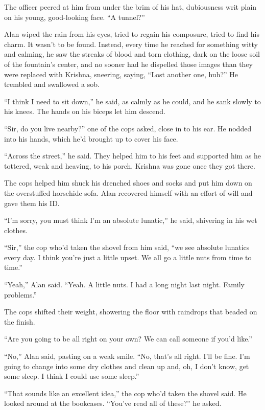 \documentclass{article}
\begin{document}
The officer peered at him from under the brim of his hat, dubiousness
writ plain on his young, good-looking face.  ``A tunnel?''

Alan wiped the rain from his eyes, tried to regain his composure,
tried to find his charm.  It wasn't to be found.  Instead, every time
he reached for something witty and calming, he saw the streaks of
blood and torn clothing, dark on the loose soil of the fountain's
center, and no sooner had he dispelled those images than they were
replaced with Krishna, sneering, saying, ``Lost another one, huh?'' He
trembled and swallowed a sob.

``I think I need to sit down,'' he said, as calmly as he could, and he
sank slowly to his knees.  The hands on his biceps let him descend.

``Sir, do you live nearby?'' one of the cops asked, close in to his
ear.  He nodded into his hands, which he'd brought up to cover his
face.

``Across the street,'' he said.  They helped him to his feet and
supported him as he tottered, weak and heaving, to his porch.  Krishna
was gone once they got there.

The cops helped him shuck his drenched shoes and socks and put him
down on the overstuffed horsehide sofa.  Alan recovered himself with
an effort of will and gave them his ID.

``I'm sorry, you must think I'm an absolute lunatic,'' he said,
shivering in his wet clothes.

``Sir,'' the cop who'd taken the shovel from him said, ``we see
absolute lunatics every day.  I think you're just a little upset.  We
all go a little nuts from time to time.''

``Yeah,'' Alan said.  ``Yeah.  A little nuts.  I had a long night last
night.  Family problems.''

The cops shifted their weight, showering the floor with raindrops that
beaded on the finish.

``Are you going to be all right on your own?  We can call someone if
you'd like.''

``No,'' Alan said, pasting on a weak smile.  ``No, that's all right. 
I'll be fine.  I'm going to change into some dry clothes and clean up
and, oh, I don't know, get some sleep.  I think I could use some
sleep.''

``That sounds like an excellent idea,'' the cop who'd taken the shovel
said.  He looked around at the bookcases.  ``You've read all of
these?'' he asked.
\end{document}
